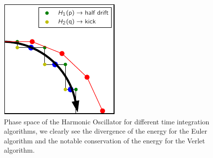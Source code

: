 \documentclass[ansiapaper]{report}
\begin{document}
\begin{multicols}{3}
  \begin{figure}[H]
    \centering
    \includegraphics[width=1\linewidth]{./figures/Velvet_euler.pdf}
    \caption{\label{fig:sample} Phase space of the Harmonic Oscillator for different time integration algorithms, we clearly see the divergence of the energy for the Euler algorithm and the notable conservation of the energy for the Verlet algorithm.}
  \end{figure}


\end{multicols}
\end{document}
